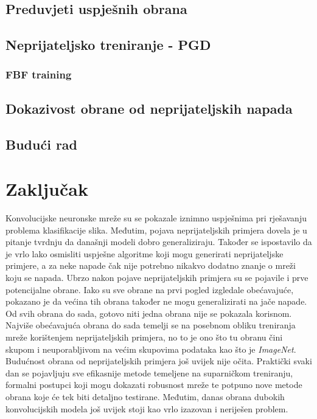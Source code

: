 \documentclass[utf8, diplomski]{fer}
\begin{document}
\section{Preduvjeti uspješnih obrana}\label{preduvjeti}
\section{Neprijateljsko treniranje - PGD}\label{pgd_training}
\subsection{FBF training}
\section{Dokazivost obrane od neprijateljskih napada}
\section{Budući rad}

\chapter{Zaključak}
Konvolucijske neuronske mreže su se pokazale iznimno uspješnima pri rješavanju problema klasifikacije slika. Međutim, pojava neprijateljskih primjera dovela je u pitanje tvrdnju da današnji modeli dobro generaliziraju. Također se ispostavilo da je vrlo lako osmisliti uspješne algoritme koji mogu generirati neprijateljske primjere, a za neke napade čak nije potrebno nikakvo dodatno znanje o mreži koju se napada. Ubrzo nakon pojave neprijateljskih primjera su se pojavile i prve potencijalne obrane. Iako su sve obrane na prvi pogled izgledale obećavajuće, pokazano je da većina tih obrana također ne mogu generalizirati na jače napade. Od svih obrana do sada, gotovo niti jedna obrana nije se pokazala korisnom. Najviše obećavajuća obrana do sada temelji se na posebnom obliku treniranja mreže korištenjem neprijateljskih primjera, no to je ono što tu obranu čini skupom i neuporabljivom na većim skupovima podataka kao što je \textit{ImageNet}. Budućnost obrana od neprijateljskih primjera još uvijek nije očita. Praktički svaki dan se pojavljuju sve efikasnije metode temeljene na suparničkom treniranju, formalni postupci koji mogu dokazati robusnost mreže te potpuno nove metode obrana koje će tek biti detaljno testirane. Međutim, danas obrana dubokih konvolucijskih modela još uvijek stoji kao vrlo izazovan i neriješen problem.
\end{document}
